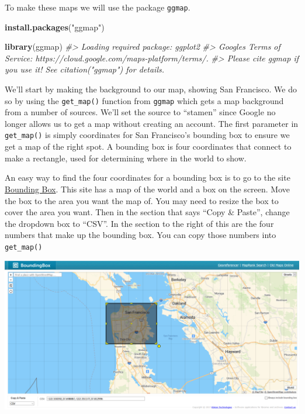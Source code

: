 \documentclass[
  12pt,
]{book}
\newenvironment{Shaded}{\begin{snugshade}}{\end{snugshade}}
\newcommand{\CommentTok}[1]{\textcolor[rgb]{0.37,0.37,0.37}{\textit{#1}}}
\newcommand{\KeywordTok}[1]{\textcolor[rgb]{0.27,0.27,0.27}{\textbf{#1}}}
\newcommand{\NormalTok}[1]{#1}
\newcommand{\StringTok}[1]{\textcolor[rgb]{0.5,0.5,0.5}{#1}}
\begin{document}
To make these maps we will use the package \texttt{ggmap}.

\begin{Shaded}
\begin{Highlighting}[]
\KeywordTok{install.packages}\NormalTok{(}\StringTok{"ggmap"}\NormalTok{)}
\end{Highlighting}
\end{Shaded}

\begin{Shaded}
\begin{Highlighting}[]
\KeywordTok{library}\NormalTok{(ggmap)}
\CommentTok{\#> Loading required package: ggplot2}
\CommentTok{\#> Google\textquotesingle{}s Terms of Service: https://cloud.google.com/maps{-}platform/terms/.}
\CommentTok{\#> Please cite ggmap if you use it! See citation("ggmap") for details.}
\end{Highlighting}
\end{Shaded}

We'll start by making the background to our map, showing San Francisco. We do so by using the \texttt{get\_map()} function from \texttt{ggmap} which gets a map background from a number of sources. We'll set the source to ``stamen'' since Google no longer allows us to get a map without creating an account. The first parameter in \texttt{get\_map()} is simply coordinates for San Francisco's bounding box to ensure we get a map of the right spot. A bounding box is four coordinates that connect to make a rectangle, used for determining where in the world to show.

An easy way to find the four coordinates for a bounding box is to go to the site \href{https://boundingbox.klokantech.com/}{Bounding Box}. This site has a map of the world and a box on the screen. Move the box to the area you want the map of. You may need to resize the box to cover the area you want. Then in the section that says ``Copy \& Paste'', change the dropdown box to ``CSV''. In the section to the right of this are the four numbers that make up the bounding box. You can copy those numbers into \texttt{get\_map()}

\includegraphics{images/bounding_box.PNG}
\end{document}
